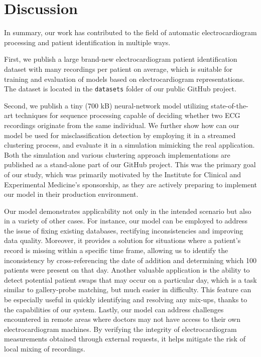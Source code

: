 \documentclass[preprint,12pt]{elsarticle}
\begin{document}
\section{Discussion}

In summary, our work has contributed to the field of automatic electrocardiogram processing and patient identification in multiple ways. 

First, we publish a large brand-new electrocardiogram patient identification dataset with many recordings per patient on average, which is suitable for training and evaluation of models based on electrocardiogram representations. The dataset is located in the \verb|datasets| folder of our public GitHub project.

Second, we publish a tiny (700 kB) neural-network model utilizing state-of-the-art techniques for sequence processing capable of deciding whether two ECG recordings originate from the same individual. We further show how can our model be used for misclassification detection by employing it in a streamed clustering process, and evaluate it in a simulation mimicking the real application. Both the simulation and various clustering approach implementations are published as a stand-alone part of our GitHub project. This was the primary goal of our study, which was primarily motivated by the Institute for Clinical and Experimental Medicine's sponsorship, as they are actively preparing to implement our model in their production environment.

Our model demonstrates applicability not only in the intended scenario but also in a variety of other cases. For instance, our model can be employed to address the issue of fixing existing databases, rectifying inconsistencies and improving data quality. Moreover, it provides a solution for situations where a patient's record is missing within a specific time frame, allowing us to identify the inconsistency by cross-referencing the date of addition and determining which 100 patients were present on that day. Another valuable application is the ability to detect potential patient swaps that may occur on a particular day, which is a task similar to gallery-probe matching, but much easier in difficulty. This feature can be especially useful in quickly identifying and resolving any mix-ups, thanks to the capabilities of our system. Lastly, our model can address challenges encountered in remote areas where doctors may not have access to their own electrocardiogram machines. By verifying the integrity of electrocardiogram measurements obtained through external requests, it helps mitigate the risk of local mixing of recordings.
\end{document}
